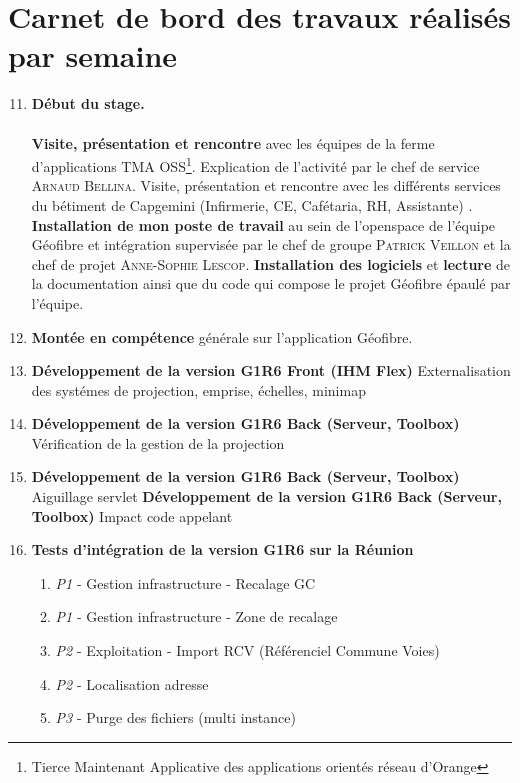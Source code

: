 \chapter{Carnet de bord des travaux réalisés par semaine}
\label{travauxreal}
\begin{enumerate}[label= Semaine \no\textbf{\arabic*.},itemsep=20pt]
\setcounter{enumi}{10}

\item \textbf{\colorbox{rouge}{Début du stage. }}\\\\
\textbf{Visite, présentation et rencontre} avec les équipes de la ferme d'applications \textsc{TMA OSS\footnote{Tierce Maintenant Applicative des applications orientés réseau d'Orange}}. Explication de l'activité par le chef de service \textsc{Arnaud Bellina}.
\newline Visite, présentation et rencontre avec les différents services du bétiment de Capgemini (Infirmerie, CE, Cafétaria, RH, Assistante) .
\newline \textbf{Installation de mon poste de travail} au sein de l'openspace de l'équipe Géofibre et intégration supervisée par le chef de groupe \textsc{Patrick Veillon} et la chef de projet \textsc{Anne-Sophie Lescop}.
\newline \textbf{Installation des logiciels} et \textbf{lecture} de la documentation ainsi que du code qui compose le projet Géofibre épaulé par l'équipe.

\item \textbf{Montée en compétence} générale sur l'application Géofibre.
\item \textbf{Développement de la version G1R6 Front (IHM Flex)} Externalisation des systémes de projection, emprise, échelles, minimap

\item \textbf{Développement de la version G1R6 Back (Serveur, Toolbox)} Vérification de la gestion de la projection

\item \textbf{Développement de la version G1R6 Back (Serveur, Toolbox)} Aiguillage servlet
\newline \textbf{Développement de la version G1R6 Back (Serveur, Toolbox)} Impact code appelant

\item \textbf{Tests d'intégration de la version G1R6 sur la Réunion}
\begin{enumerate}[label = Tests \no\arabic*.,align=left]
\item \emph{\colorbox{rouge}{P1}} - Gestion infrastructure - Recalage GC
\item \emph{\colorbox{rouge}{P1}} - Gestion infrastructure - Zone de recalage
\item \emph{\colorbox{rouge-clair}{P2}} - Exploitation - Import RCV (Référenciel Commune Voies)
\item \emph{\colorbox{rouge-clair}{P2}} - Localisation adresse
\item \emph{\colorbox{rouge-tres-clair}{P3}} - Purge des fichiers (multi instance)
\end{enumerate}


\end{enumerate}
